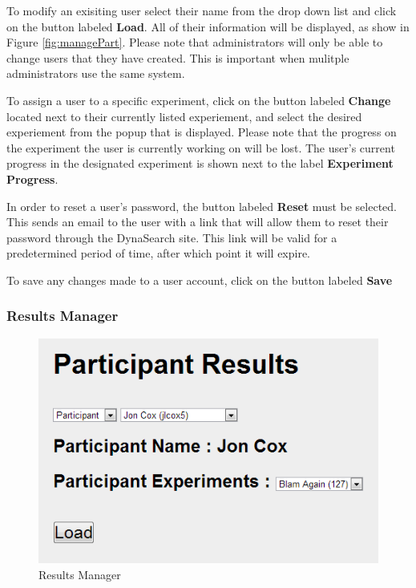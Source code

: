 \documentclass[article]{ij4uq}              %
\begin{document}
To modify an exisiting user select their name from the drop down list and click on the button labeled \textbf{Load}.  All of their information will be displayed, as show in Figure \ref{fig:managePart}.  Please note that administrators will only be able to change users that they have created.  This is important when mulitple administrators use the same system.

To assign a user to a specific experiment, click on the button labeled \textbf{Change} located next to their currently listed experiement, and select the desired experiement from the popup that is displayed.  Please note that the progress on the experiment the user is currently working on will be lost. The user's current progress in the designated experiment is shown next to the label \textbf{Experiment Progress}. 

In order to reset a user's password, the button labeled \textbf{Reset} must be selected.  This sends an email to the user with a link that will allow them to reset their password through the DynaSearch site.  This link will be valid for a predetermined period of time, after which point it will expire.

To save any changes made to a user account, click on the button labeled \textbf{Save}


\subsubsection {Results Manager}

\begin{figure}[h!]
 \centering
 \includegraphics[width=5.0in]{figures/part_results.png}
 \caption{Results Manager}
 \label{fig:partResults}
\end{figure}
\FloatBarrier
\end{document}
